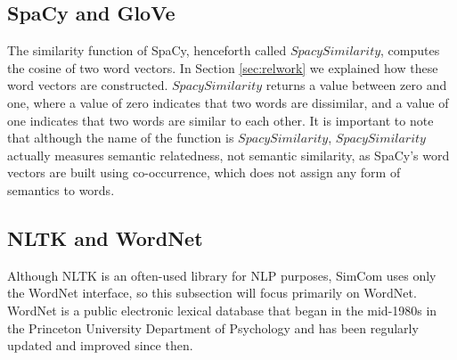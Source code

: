 \documentclass{article}
\begin{document}
\subsection{SpaCy and GloVe}
The similarity function of SpaCy, henceforth called $\textit{SpacySimilarity}$, computes the cosine of two word vectors. In Section \ref{sec:relwork} we explained how these word vectors are constructed. $\textit{SpacySimilarity}$ returns a value between zero and one, where a value of zero indicates that two words are dissimilar, and a value of one indicates that two words are similar to each other. It is important to note that although the name of the function is $\textit{SpacySimilarity}$, $\textit{SpacySimilarity}$ actually measures semantic relatedness, not semantic similarity, as SpaCy's word vectors are built using co-occurrence, which does not assign any form of semantics to words. 

\subsection{NLTK and WordNet}
Although NLTK is an often-used library for NLP purposes, SimCom uses only the WordNet interface, so this subsection will focus primarily on WordNet. WordNet is a public electronic lexical database that began in the mid-1980s in the Princeton University Department of Psychology and has been regularly updated and improved since then. 
\end{document}
